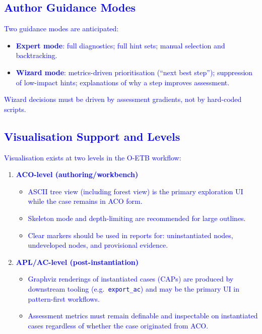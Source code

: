 \documentclass[11pt]{article}
\begin{document}
\subsection{\textcolor{blue}{Author Guidance Modes}}

\textcolor{blue}{Two guidance modes are anticipated:}

\begin{itemize}[leftmargin=2em]
  \item \textcolor{blue}{\textbf{Expert mode}: full diagnostics; full hint sets; manual selection and backtracking.}
  \item \textcolor{blue}{\textbf{Wizard mode}: metrics-driven prioritisation (``next best step''); suppression of low-impact hints; explanations of why a step improves assessment.}
\end{itemize}

\textcolor{blue}{Wizard decisions must be driven by assessment gradients, not by hard-coded scripts.}

\subsection{\textcolor{blue}{Visualisation Support and Levels}}

\textcolor{blue}{Visualisation exists at two levels in the O-ETB workflow:}

\begin{enumerate}[leftmargin=2em]
  \item \textcolor{blue}{\textbf{ACO-level (authoring/workbench)}}
  \begin{itemize}[leftmargin=1.5em]
    \item \textcolor{blue}{ASCII tree view (including forest view) is the primary exploration UI while the case remains in ACO form.}
    \item \textcolor{blue}{Skeleton mode and depth-limiting are recommended for large outlines.}
    \item \textcolor{blue}{Clear markers should be used in reports for: uninstantiated nodes, undeveloped nodes, and provisional evidence.}
  \end{itemize}

  \item \textcolor{blue}{\textbf{APL/AC-level (post-instantiation)}}
  \begin{itemize}[leftmargin=1.5em]
    \item \textcolor{blue}{Graphviz renderings of instantiated cases (CAPs) are produced by downstream tooling (e.g.\ \texttt{export\_ac}) and may be the primary UI in pattern-first workflows.}
    \item \textcolor{blue}{Assessment metrics must remain definable and inspectable on instantiated cases regardless of whether the case originated from ACO.}
  \end{itemize}
\end{enumerate}
\end{document}
